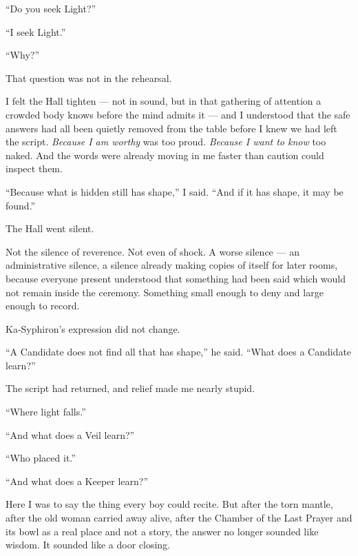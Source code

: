 ``Do you seek Light?''\par
``I seek Light.''\par
``Why?''\par

That question was not in the rehearsal.\par

I felt the Hall tighten --- not in sound, but in that gathering of attention a crowded body knows before the mind admits it --- and I understood that the safe 
answers had all been quietly removed from the table before I knew we had left the script. 
\textit{Because I am worthy} was too proud. 
\textit{Because I want to know} too naked. 
And the words were already moving in me faster than caution could inspect them.\par

``Because what is hidden still has shape,'' I said. ``And if it has shape, it may be found.''\par

The Hall went silent.\par

Not the silence of reverence. 
Not even of shock. 
A worse silence --- an administrative silence, a silence already making copies of itself for later rooms, because everyone present understood that something had 
been said which would not remain inside the ceremony. 
Something small enough to deny and large enough to record.\par

Ka-Syphiron's expression did not change. 

``A Candidate does not find all that has shape,'' he said. ``What does a Candidate learn?''\par

The script had returned, and relief made me nearly stupid.\par

``Where light falls.''\par
``And what does a Veil learn?''\par
``Who placed it.''\par
``And what does a Keeper learn?''\par

Here I was to say the thing every boy could recite. 
But after the torn mantle, after the old woman carried away alive, after the Chamber of the Last Prayer and its bowl as a real place and not a story, 
the answer no longer sounded like wisdom. 
It sounded like a door closing.\par

